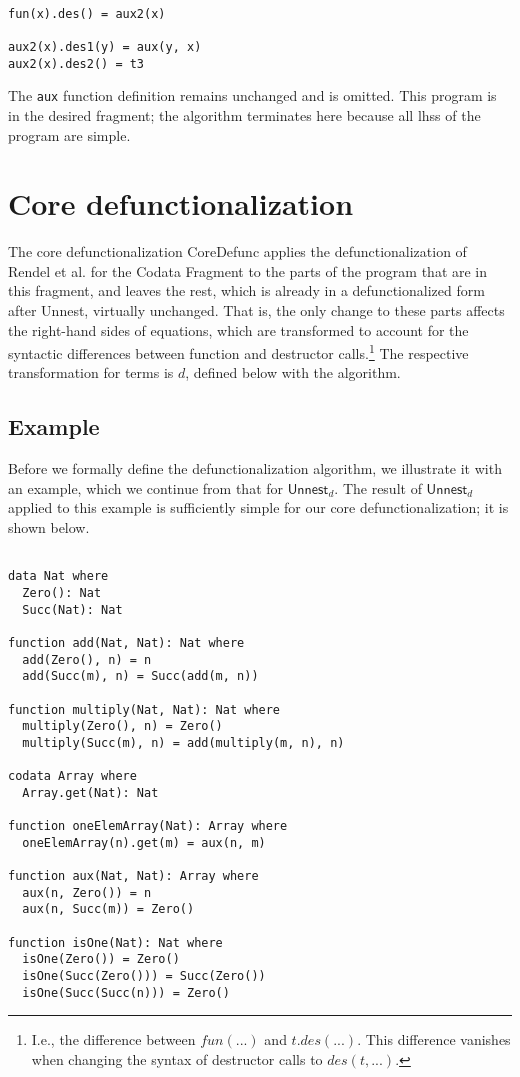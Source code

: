 \begin{lstlisting}

fun(x).des() = aux2(x)

aux2(x).des1(y) = aux(y, x)
aux2(x).des2() = t3

\end{lstlisting}

The \texttt{aux} function definition remains unchanged and is omitted. This program is in the desired fragment; the algorithm terminates here because all lhss of the program are simple.

\section{Core defunctionalization}

The core defunctionalization \textsf{CoreDefunc} applies the defunctionalization of Rendel et al. for the Codata Fragment to the parts of the program that are in this fragment, and leaves the rest, which is already in a defunctionalized form after \textsf{Unnest}, virtually unchanged. That is, the only change to these parts affects the right-hand sides of equations, which are transformed to account for the syntactic differences between function and destructor calls.\footnote{I.e., the difference between $fun(...)$ and $t.des(...)$. This difference vanishes when changing the syntax of destructor calls to $des(t, ...)$.} The respective transformation for terms is $d$, defined below with the algorithm.

\subsection{Example}

Before we formally define the defunctionalization algorithm, we illustrate it with an example, which we continue from that for $\textsf{Unnest}_d$. The result of $\textsf{Unnest}_d$ applied to this example is sufficiently simple for our core defunctionalization; it is shown below.

\begin{lstlisting}

data Nat where
  Zero(): Nat
  Succ(Nat): Nat

function add(Nat, Nat): Nat where
  add(Zero(), n) = n
  add(Succ(m), n) = Succ(add(m, n))

function multiply(Nat, Nat): Nat where
  multiply(Zero(), n) = Zero()
  multiply(Succ(m), n) = add(multiply(m, n), n)

codata Array where
  Array.get(Nat): Nat

function oneElemArray(Nat): Array where
  oneElemArray(n).get(m) = aux(n, m)

function aux(Nat, Nat): Array where
  aux(n, Zero()) = n
  aux(n, Succ(m)) = Zero()

function isOne(Nat): Nat where
  isOne(Zero()) = Zero()
  isOne(Succ(Zero())) = Succ(Zero())
  isOne(Succ(Succ(n))) = Zero()

\end{lstlisting}

